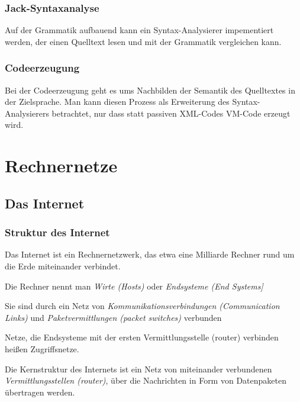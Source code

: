 \documentclass[12pt]{report}
\begin{document}
\subsection{Jack-Syntaxanalyse}
Auf der Grammatik aufbauend kann ein Syntax-Analysierer impementiert werden,
der einen Quelltext lesen und mit der Grammatik vergleichen kann.

\subsection{Codeerzeugung}
Bei der Codeerzeugung geht es ums Nachbilden der Semantik des Quelltextes in der Zielsprache.
Man kann diesen Prozess als Erweiterung des Syntax-Analysierers betrachtet, nur dass statt passiven XML-Codes VM-Code erzeugt wird.


\chapter{Rechnernetze}

\section{Das Internet}
\subsection{Struktur des Internet}
\begin{defbox}
  Das Internet ist ein Rechnernetzwerk, das etwa eine Milliarde Rechner rund um die Erde miteinander verbindet.
  
  Die Rechner nennt man \textit{Wirte (Hosts)} oder \textit{Endsysteme (End Systems]}
  
  Sie sind durch ein Netz von \textit{Kommunikationsverbindungen (Communication Links)} und \textit{Paketvermittlungen (packet switches)} verbunden
\end{defbox}

Netze, die Endsysteme mit der ersten Vermittlungsstelle (router) verbinden heißen Zugriffsnetze.


\begin{defbox}[Vermittlungsstellen]
  Die Kernstruktur des Internets ist ein Netz von miteinander verbundenen
  \textit{Vermittlungsstellen (router)}, über die Nachrichten in Form von Datenpaketen übertragen werden.
\end{defbox}
\end{document}
